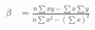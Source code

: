 \documentclass{article}
\begin{document}
	\begin{align*}
		\beta&=\frac{n\sum{xy}-\sum{x}\sum{y}}{n\sum{x^2}-(\sum{x})^2}
	\end{align*}
\end{document}
